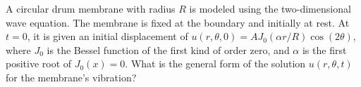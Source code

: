\documentclass[border=10pt]{standalone}
\begin{document}
\begin{tcolorbox}[
    enhanced,
    colback=questionbg,
    colframe=questionborder,
    boxrule=1pt,
    arc=5pt,
    outer arc=5pt,
    drop fuzzy shadow=questionborder,
    fontupper=\large\sffamily
]
A circular drum membrane with radius $R$ is modeled using the two-dimensional wave equation. The membrane is fixed at the boundary and initially at rest. At $t=0$, it is given an initial displacement of $u(r,\theta,0) = A J_0(\alpha r/R) \cos(2\theta)$, where $J_0$ is the Bessel function of the first kind of order zero, and $\alpha$ is the first positive root of $J_0(x)=0$. What is the general form of the solution $u(r,\theta,t)$ for the membrane's vibration?
\end{tcolorbox}
\end{document}

